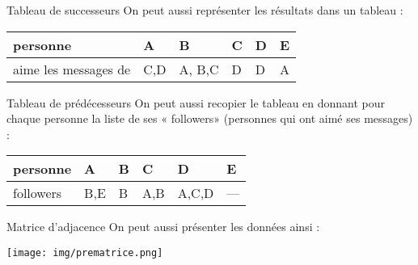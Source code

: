 \documentclass[10pt]{beamer}
\begin{document}
\begin{frame}{Tableau de successeurs}
On peut aussi représenter les résultats dans un tableau :

\begin{center}
\begin{tabular}{|l|>{\centering\arraybackslash}p{.5cm}|>{\centering\arraybackslash}p{.5cm}|>{\centering\arraybackslash}p{.5cm}|>{\centering\arraybackslash}p{.5cm}|>{\centering\arraybackslash}p{.5cm}|}
\hline\rowcolor{UGLiBlack}
\textbf{\color{UGLiWhite}personne}& \textbf{\color{UGLiWhite}A} & \textbf{\color{UGLiWhite}B} &\textbf{\color{UGLiWhite}C}& \textbf{\color{UGLiWhite}D} & \textbf{\color{UGLiWhite}E} \\
\hline
aime les messages de  & C,D & A, B,C & D & D & A \\
\hline


%
%
%
\end{tabular}
\end{center}
\end{frame}

\begin{frame}{Tableau de prédécesseurs}
On peut aussi recopier le tableau en donnant pour chaque personne la liste de ses « followers» (personnes qui ont aimé ses messages) :

\begin{center}
\begin{tabular}{|l|>{\centering\arraybackslash}p{1cm}|>{\centering\arraybackslash}p{1cm}|>{\centering\arraybackslash}p{1cm}|>{\centering\arraybackslash}p{1cm}|>{\centering\arraybackslash}p{1cm}|}
\hline\rowcolor{beamerBlack}
\textbf{\color{beamerWhite}personne}& \textbf{\color{beamerWhite}A} & \textbf{\color{beamerWhite}B} &\textbf{\color{beamerWhite}C}& \textbf{\color{beamerWhite}D} & \textbf{\color{beamerWhite}E} \\
\hline
followers  & B,E & B & A,B & A,C,D & --- \\
\hline
\end{tabular}
\end{center}
\end{frame}

\begin{frame}{Matrice d'adjacence}
On peut aussi présenter les données ainsi :

\begin{center}
\texttt{[image: img/prematrice.png]}
\end{center}
\end{frame}
\end{document}

